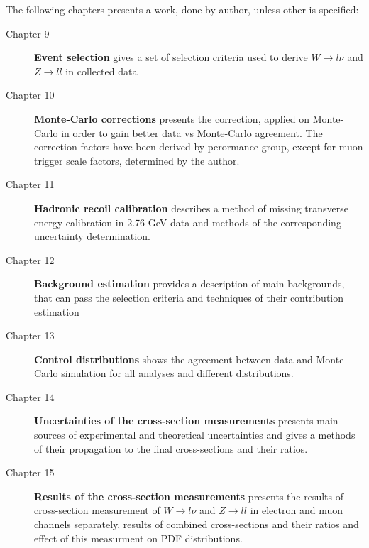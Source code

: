 The following chapters presents a work, done by author, unless other is specified:
\begin{description}
\item [Chapter 9] \textbf{Event selection} gives a set of selection criteria used to derive $W\to l\nu$ and $Z\to ll$ in collected data
\item [Chapter 10] \textbf{Monte-Carlo corrections} presents the correction, applied on Monte-Carlo in order to gain better data vs Monte-Carlo agreement. The correction factors have been derived by perormance group, except for muon trigger scale factors, determined by the author.
\item [Chapter 11] \textbf{Hadronic recoil calibration} describes a method of missing transverse energy calibration in 2.76 GeV data and methods of the corresponding uncertainty determination.
\item [Chapter 12] \textbf{Background estimation} provides a description of main backgrounds, that can pass the selection criteria and techniques of their contribution estimation
\item [Chapter 13] \textbf{Control distributions} shows the agreement between data and Monte-Carlo simulation for all analyses and different distributions.
\item [Chapter 14] \textbf{Uncertainties of the cross-section measurements} presents main sources of experimental and theoretical uncertainties and gives a methods of their propagation to the final cross-sections and their ratios.
\item [Chapter 15] \textbf{Results of the cross-section measurements} presents the results of cross-section measurement of $W\to l\nu$ and $Z\to ll$ in electron and muon channels separately, results of combined cross-sections and their ratios and effect of this measurment on PDF distributions.
\end{description}